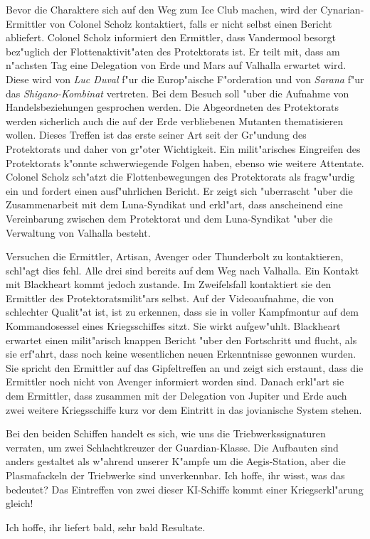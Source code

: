 Bevor die Charaktere sich auf den Weg zum Ice Club machen, wird der Cynarian-Ermittler von Colonel Scholz kontaktiert, falls er nicht selbst einen Bericht abliefert. Colonel Scholz informiert den Ermittler, dass Vandermool besorgt bez"uglich der Flottenaktivit"aten des Protektorats ist. Er teilt mit, dass am n"achsten Tag eine Delegation von Erde und Mars auf Valhalla erwartet wird. Diese wird von 
\emph{Luc Duval} f"ur die Europ"aische F"orderation und von \emph{Sarana} f"ur das \emph{Shigano-Kombinat} vertreten. Bei dem Besuch soll "uber die Aufnahme von Handelsbeziehungen gesprochen werden. Die Abgeordneten des Protektorats werden sicherlich auch die auf der Erde verbliebenen Mutanten thematisieren wollen. Dieses Treffen ist das erste seiner Art seit der Gr"undung des Protektorats und daher von gr"o\3ter Wichtigkeit. Ein milit"arisches Eingreifen des Protektorats k"onnte schwerwiegende Folgen haben, ebenso wie weitere Attentate. Colonel Scholz sch"atzt die Flottenbewegungen des Protektorats als fragw"urdig ein und fordert einen ausf"uhrlichen Bericht. Er zeigt sich "uberrascht "uber die Zusammenarbeit mit dem Luna-Syndikat und erkl"art, dass anscheinend eine Vereinbarung zwischen dem Protektorat und dem Luna-Syndikat "uber die Verwaltung von Valhalla besteht.


Versuchen die Ermittler, Artisan, Avenger oder Thunderbolt zu kontaktieren, schl"agt dies fehl. Alle drei sind bereits auf dem Weg nach Valhalla. Ein Kontakt mit Blackheart kommt jedoch zustande. Im Zweifelsfall kontaktiert sie den Ermittler des Protektoratsmilit"ars selbst. Auf der Videoaufnahme, die von schlechter Qualit"at ist, ist zu erkennen, dass sie in voller Kampfmontur auf dem Kommandosessel eines Kriegsschiffes sitzt. Sie wirkt aufgew"uhlt. Blackheart erwartet einen milit"arisch knappen Bericht "uber den Fortschritt und flucht, als sie erf"ahrt, dass noch keine wesentlichen neuen Erkenntnisse gewonnen wurden. Sie spricht den Ermittler auf das Gipfeltreffen an und zeigt sich erstaunt, dass die Ermittler noch nicht von Avenger informiert worden sind. Danach erkl"art sie dem Ermittler, dass zusammen mit der Delegation von Jupiter und Erde auch zwei weitere Kriegsschiffe kurz vor dem Eintritt in das jovianische System stehen.

\begin{speech}
	Bei den beiden Schiffen handelt es sich, wie uns die Triebwerkssignaturen verraten, um zwei Schlachtkreuzer der Guardian-Klasse. Die Aufbauten sind anders gestaltet als w"ahrend unserer K"ampfe um die Aegis-Station, aber die Plasmafackeln der Triebwerke sind unverkennbar. Ich hoffe, ihr wisst, was das bedeutet? Das Eintreffen von zwei dieser KI-Schiffe kommt einer Kriegserkl"arung gleich!

	Ich hoffe, ihr liefert bald, sehr bald Resultate.
\end{speech}

